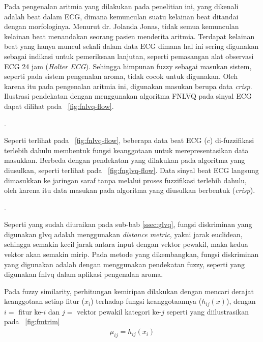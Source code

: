 
Pada pengenalan aritmia yang dilakukan pada penelitian ini, yang dikenali
adalah beat dalam ECG, dimana kemunculan suatu kelainan beat ditandai dengan
morfologinya. Menurut dr. Jolanda Jonas, tidak semua kemunculan kelainan beat
menandakan seorang pasien menderita aritmia. Terdapat kelainan beat yang hanya muncul
sekali dalam data ECG dimana hal ini sering digunakan sebagai indikasi untuk
pemeriksaan lanjutan, seperti pemasangan alat observasi ECG 24 jam
(\emph{Holter ECG}). Sehingga himpunan fuzzy sebagai masukan
sistem, seperti pada sistem pengenalan aroma, tidak cocok untuk digunakan. Oleh
karena itu pada pengenalan aritmia ini, digunakan masukan berupa data
\emph{crisp}.  Ilustrasi pendekatan dengan menggunakan algoritma FNLVQ pada
sinyal ECG dapat dilihat pada \pic~\ref{fig:fnlvq-flow}. 
 
.

Seperti terlihat pada \pic~\ref{fig:fnlvq-flow}, beberapa data beat ECG ($c$)
di-fuzzifikasi terlebih dahulu membentuk fungsi keanggotaan untuk
merepresentasikan data masukkan. Berbeda dengan pendekatan yang dilakukan pada
algoritma yang diusulkan, seperti terlihat pada \pic~\ref{fig:fnglvq-flow}. Data
sinyal beat ECG langsung dimasukkan ke jaringan saraf tanpa melalui proses
fuzzifikasi terlebih dahulu, oleh karena itu data masukan pada
algoritma yang diusulkan berbentuk (\emph{crisp}).

.
 
Seperti yang sudah diuraikan pada sub-bab \ref{ssec:glvq}, fungsi diskriminan
yang digunakan \gls{glvq} adalah menggunakan \emph{distance \gls{metric}}, yakni
jarak euclidean, sehingga semakin kecil jarak antara input dengan vektor
pewakil, maka kedua vektor akan semakin mirip. Pada metode yang dikembangkan,
fungsi diskriminan yang digunakan adalah dengan menggunakan
pendekatan fuzzy, seperti yang digunakan \gls{fnlvq} dalam aplikasi pengenalan
aroma.


Pada fuzzy similarity, perhitungan kemiripan dilakukan dengan mencari derajat
keanggotaan setiap fitur ($x_i$) terhadap fungsi keanggotaannya ($h_{ij}(x)$), 
dengan $i=$ fitur ke-$i$ dan $j=$ vektor pewakil kategori ke-$j$ seperti yang
diilustrasikan pada \pic~\ref{fig:fmtrim}
\begin{align}
	\mu_{ij} = h_{ij}(x_i)
\end{align}

